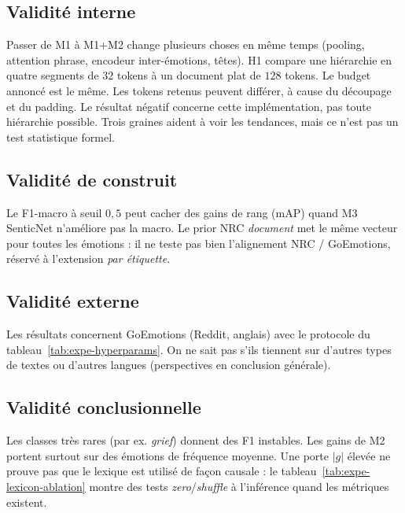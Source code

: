 \subsection{Validité interne}
Passer de M1 à M1+M2 change plusieurs choses en même temps (pooling,
attention phrase, encodeur inter-émotions, têtes). H1 compare une
hiérarchie en quatre segments de $32$ tokens à un document plat de
$128$ tokens. Le budget annoncé est le même. Les tokens retenus peuvent
différer, à cause du découpage et du padding. Le résultat négatif
concerne cette implémentation, pas toute hiérarchie possible. Trois
graines aident à voir les tendances, mais ce n'est pas un test
statistique formel.

\subsection{Validité de construit}
Le F1-macro à seuil $0{,}5$ peut cacher des gains de rang (mAP) quand M3
SenticNet n'améliore pas la macro. Le prior NRC \emph{document} met le
même vecteur pour toutes les émotions : il ne teste pas bien l'alignement
NRC / GoEmotions, réservé à l'extension \emph{par étiquette}.

\subsection{Validité externe}
Les résultats concernent GoEmotions (Reddit, anglais) avec le protocole
du tableau~\ref{tab:expe-hyperparams}. On ne sait pas s'ils tiennent sur
d'autres types de textes ou d'autres langues (perspectives en
conclusion générale).

\subsection{Validité conclusionnelle}
Les classes très rares (par ex. \emph{grief}) donnent des F1 instables.
Les gains de M2 portent surtout sur des émotions de fréquence moyenne. Une
porte $|g|$ élevée ne prouve pas que le lexique est utilisé de façon
causale : le tableau~\ref{tab:expe-lexicon-ablation} montre des tests
\emph{zero}/\emph{shuffle} à l'inférence quand les métriques existent.

